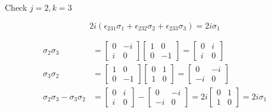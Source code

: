 \documentclass[11pt]{article}
\begin{document}
\begin{enumerate}
\begin{enumerate}
		            Check $j = 2, k = 3$

		            \begin{equation*}
			            2i(\epsilon_{231} \sigma_1 + \epsilon_{232} \sigma_2 + \epsilon_{233} \sigma_3) = 2i\sigma_1
		            \end{equation*}

		            \begin{align*}
			            \sigma_2 \sigma_3                     & =
			            \begin{bmatrix}
				            0 & -i \\ i & 0
			            \end{bmatrix}
			            \begin{bmatrix}
				            1 & 0 \\ 0 & -1
			            \end{bmatrix} =
			            \begin{bmatrix}
				            0 & i \\ i & 0
			            \end{bmatrix}                           \\
			            \sigma_3 \sigma_2                     & =
			            \begin{bmatrix}
				            1 & 0 \\ 0 & -1
			            \end{bmatrix}
			            \begin{bmatrix}
				            0 & 1 \\ 1 & 0
			            \end{bmatrix} =
			            \begin{bmatrix}
				            0 & -i \\ -i & 0
			            \end{bmatrix}                          \\
			            \sigma_2 \sigma_3 - \sigma_3 \sigma_2 & =
			            \begin{bmatrix}
				            0 & i \\ i & 0
			            \end{bmatrix} -
			            \begin{bmatrix}
				            0 & -i \\ -i & 0
			            \end{bmatrix} =
			            2i \begin{bmatrix}
				               0 & 1 \\ 1 & 0
			               \end{bmatrix} = 2i\sigma_1
		            \end{align*}


\end{enumerate}
\end{enumerate}
\end{document}
